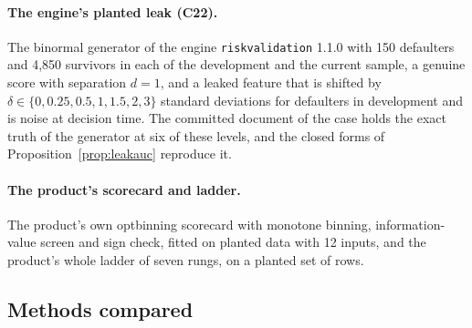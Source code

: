 \paragraph{The engine's planted leak (C22).} The binormal generator of the engine \texttt{riskvalidation} 1.1.0 with 150 defaulters and 4,850 survivors in each of the development and the current sample, a genuine score with separation $d=1$, and a leaked feature that is shifted by $\delta\in\{0,0.25,0.5,1,1.5,2,3\}$ standard deviations for defaulters in development and is noise at decision time. The committed document of the case holds the exact truth of the generator at six of these levels, and the closed forms of Proposition~\ref{prop:leakauc} reproduce it.

\paragraph{The product's scorecard and ladder.} The product's own optbinning scorecard \citep{navas2020} with monotone binning, information-value screen and sign check, fitted on planted data with 12 inputs, and the product's whole ladder of seven rungs, on a planted set of  rows.

\subsection{Methods compared}

